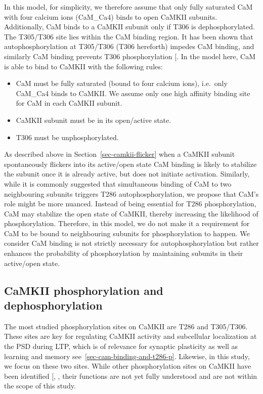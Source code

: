\documentclass[
  11pt,
  letterpaper,
]{scrreprt}
\providecommand{\tightlist}{%
  \setlength{\itemsep}{0pt}\setlength{\parskip}{0pt}}\usepackage{longtable,booktabs,array}
\begin{document}
In this model, for simplicity, we therefore assume that only fully
saturated CaM with four calcium ions (CaM\_Ca4) binds to open CaMKII
subunits. Additionally, CaM binds to a CaMKII subunit only if T306 is
dephosphorylated. The T305/T306 site lies within the CaM binding region.
It has been shown that autophosphorylation at T305/T306 (T306 hereforth)
impedes CaM binding, and similarly CaM binding prevents T306
phosphorylation {[}\citeproc{ref-rellos2010Structure}{464}{]}. In the
model here, CaM is able to bind to CaMKII with the following rules:

\begin{itemize}
\tightlist
\item
  CaM must be fully saturated (bound to four calcium ions), i.e.~only
  CaM\_Ca4 binds to CaMKII. We assume only one high affinity binding
  site for CaM in each CaMKII subunit.
\item
  CaMKII subunit must be in its open/active state.
\item
  T306 must be unphosphorylated.
\end{itemize}

As described above in Section~\ref{sec-camkii-flicker} when a CaMKII
subunit spontaneously flickers into its active/open state CaM binding is
likely to stabilize the subunit once it is already active, but does not
initiate activation. Similarly, while it is commonly suggested that
simultaneous binding of CaM to two neighbouring subunits triggers T286
autophosphorylation, we propose that CaM's role might be more nuanced.
Instead of being essential for T286 phosphorylation, CaM may stabilize
the open state of CaMKII, thereby increasing the likelihood of
phosphorylation. Therefore, in this model, we do not make it a
requirement for CaM to be bound to neighbouring subunits for
phosphorylation to happen. We consider CaM binding is not strictly
necessary for autophosphorylation but rather enhances the probability of
phosphorylation by maintaining subunits in their active/open state.

\subsection{CaMKII phosphorylation and
dephosphorylation}\label{camkii-phosphorylation-and-dephosphorylation}

The most studied phosphorylation sites on CaMKII are T286 and T305/T306.
These sites are key for regulating CaMKII activity and subcellular
localization at the PSD during LTP, which is of relevance for synaptic
plasticity as well as learning and memory
see~\ref{sec-cam-binding-and-t286-p}. Likewise, in this study, we focus
on these two sites. While other phosphorylation sites on CaMKII have
been identified {[},
\citeproc{ref-gangopadhyay2008Regulation}{466}{]}, their functions are
not yet fully understood and are not within the scope of this study.
\end{document}
